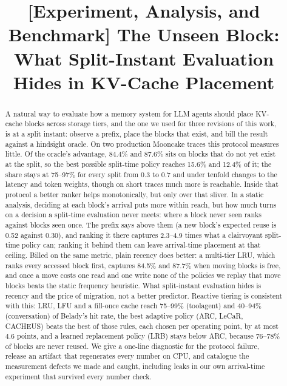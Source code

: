 \documentclass[conference]{IEEEtran}
\begin{document}
\title{[Experiment, Analysis, and Benchmark] The Unseen Block: What Split-Instant Evaluation
Hides in KV-Cache Placement}

\author{
}

\maketitle

\begin{abstract}
A natural way to evaluate how a memory system for LLM agents should place KV-cache blocks across
storage tiers, and the one we used for three revisions of this work, is at a split instant: observe a
prefix, place the blocks that exist, and bill the result against a hindsight oracle. On two production
Mooncake traces this protocol measures little. Of the oracle's advantage, 84.4\% and 87.6\% sits on
blocks that do not yet exist at the split, so the best possible split-time policy reaches 15.6\% and
12.4\% of it; the share stays at 75--97\% for every split from 0.3 to 0.7 and under tenfold changes to
the latency and token weights, though on short traces much more is reachable. Inside that protocol a
better ranker helps monotonically, but only over that sliver. In a static analysis, deciding at each
block's arrival puts more within reach, but how much turns on a decision a split-time evaluation never
meets: where a block never seen ranks against blocks seen once. The prefix says above them (a new
block's expected reuse is 0.52 against 0.30), and ranking it there captures 2.3--4.9 times what a
clairvoyant split-time policy can; ranking it behind them can leave arrival-time placement at that
ceiling. Billed on the same metric, plain recency does better: a multi-tier LRU, which ranks every
accessed block first, captures 84.5\% and 87.7\% when moving blocks is free, and once a move costs one
read and one write none of the policies we replay that move blocks beats the static frequency heuristic. What split-instant
evaluation hides is recency and the price of migration, not a better predictor. Reactive tiering is consistent with this: LRU, LFU and a fill-once cache
reach 75--99\% (toolagent) and 40--94\% (conversation) of Belady's hit rate, the best adaptive policy (ARC, LeCaR, CACHEUS) beats
the best of those rules, each chosen per operating point, by at most 4.6 points, and a learned
replacement policy (LRB) stays below ARC, because 76--78\% of blocks are never reused. We give a one-line
diagnostic for the protocol failure, release an artifact that regenerates every number on CPU, and
catalogue the measurement defects we made and caught, including leaks in our own arrival-time experiment
that survived every number check.
\end{abstract}
\end{document}
